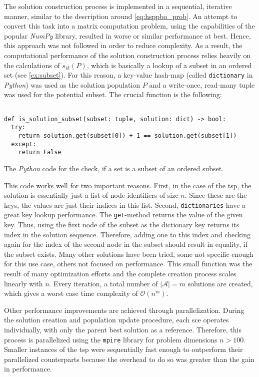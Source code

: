 The solution construction process is implemented in a sequential, iterative manner, similar to the description around \cref{eq:hsppbo_prob}. An attempt to convert this task into a matrix computation problem, using the capabilities of the popular \textit{NumPy} \cite{harris2020array} library, resulted in worse or similar performance at best. Hence, this approach was not followed in order to reduce complexity.
As a result, the computational performance of the solution construction process relies heavily on the calculations of $s_{ik}(P)$, which is basically a lookup of a subset in an ordered set (see \cref{ex:subset}).
For this reason, a key-value hash-map (called \texttt{dictionary} in \textit{Python}) was used as the solution population $P$ and a write-once, read-many tuple was used for the potential subset. The crucial function is the following:
\begin{Listing}[h]
	\begin{verbatim}
		
def is_solution_subset(subset: tuple, solution: dict) -> bool:
  try:
    return solution.get(subset[0]) + 1 == solution.get(subset[1])
  except:
    return False
	\end{verbatim}
	\caption{The \textit{Python} code for the check, if a set is a subset of an ordered subset.}
	\label{lst:subset}
\end{Listing}

This code works well for two important reasons.
First, in the case of the \gls{tsp}, the solution is essentially just a list of node identifiers of size $n$. Since these are the keys, the values are just their indices in this list.
Second, \texttt{dictionaries} have a great key lookup performance. The \texttt{get}-method returns the value of the given key.
Thus, using the first node of the subset as the dictionary key returns its index in the solution sequence. Therefore, adding one to this index and checking again for the index of the second node in the subset should result in equality, if the subset exists. 
Many other solutions have been tried, some not specific enough for this use case, others not focused on performance. This small function was the result of many optimization efforts and the complete creation process scales linearly with $n$. Every iteration, a total number of $|\mathcal{A}| = m$ solutions are created, which gives a worst case time complexity of $\mathcal{O}(n^m)$.

Other performance improvements are achieved through parallelization. During the solution creation and population update procedure, each \gls{sce} operates individually, with only the parent best solution as a reference. Therefore, this process is parallelized using the \texttt{mpire} library \cite{mpire2023} for problem dimensions $n > 100$. Smaller instances of the \gls{tsp} were sequentially fast enough to outperform their parallelized counterparts because the overhead to do so was greater than the gain in performance.

